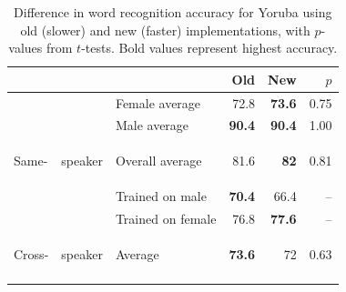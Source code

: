 \documentclass[11pt]{article}
\begin{document}
\begin{table}[tb]
\begin{center}
\begin{tabularx}{\columnwidth}{p{1mm} p{3mm} l r r r}
\hline
 & & & Old & New & $p$\\
\hline
\noalign{\smallskip}


& & Female  average & 72.8 & \textbf{73.6} & 0.75 \\
& & Male  average & \textbf{90.4} & \textbf{90.4} & 1.00\\
\multirow{-3}{*}{\begin{sideways} Same-\end{sideways}}& \multirow{-3}{*}{\begin{sideways} speaker \end{sideways}}& Overall average & 81.6 & \textbf{82} & 0.81 \\

\noalign{\smallskip}
\hline
\noalign{\smallskip}

&& Trained on male& \textbf{70.4} & 66.4 & --\\
&& Trained on female & 76.8 & \textbf{77.6} & --\\
\multirow{-3}{*}{\begin{sideways}{ Cross-}\end{sideways}}&\multirow{-3}{*}{\begin{sideways}{ speaker}\end{sideways}}& Average & \textbf{73.6} & 72 & 0.63\\

\noalign{\smallskip}
\hline
\end{tabularx}
\end{center}
\caption{Difference in word recognition accuracy for Yoruba 
using old (slower) and new (faster) implementations, with $p$-values from 
$t$-tests. Bold values represent highest accuracy. \label{tab:accuracy}}
\end{table}
\end{document}
